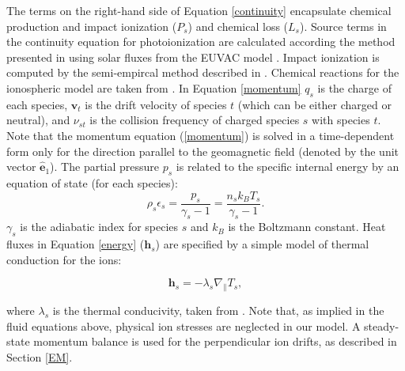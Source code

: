 \documentclass[11pt,letterpaper]{article}
\begin{document}
The terms on the right-hand side of Equation \ref{continuity} encapsulate chemical production and impact ionization ($P_s$) and chemical loss ($L_s$). Source terms in the continuity equation for photoionization are calculated according the method presented in \citet{Solomon:2005} using solar fluxes from the EUVAC model \citep{Richards:1994}. Impact ionization is computed by the semi-empircal method described in \citet{Fang:2008}. Chemical reactions for the ionospheric model are taken from \citet[][and references therein]{Diloy:1996,Stmaurice:1998}. In Equation \ref{momentum} $q_s$ is the charge of each species, $\mathbf{v}_t$ is the drift velocity of species $t$ (which can be either charged or neutral), and $\nu_{st}$ is the collision frequency of charged species $s$ with species $t$. Note that the momentum equation (\ref{momentum}) is solved in a time-dependent form only for the direction parallel to the geomagnetic field (denoted by the unit vector $\hat{\mathbf{e}}_1$). The partial pressure $p_s$ is related to the specific internal energy by an equation of state (for each species):
\begin{equation}
\rho_s \epsilon_s = \frac{p_s}{\gamma_s - 1} = \frac{n_s k_B T_s}{\gamma_s - 1}.
\end{equation}
$\gamma_s$ is the adiabatic index for species $s$ and $k_B$ is the Boltzmann constant.  Heat fluxes in Equation \ref{energy} ($\mathbf{h}_s$) are specified by a simple model of thermal conduction for the ions:  
\begin{linenomath*} \begin{equation}
\mathbf{h}_s = - \lambda_s \nabla_{\parallel} T_s,
\end{equation} \end{linenomath*}
where $\lambda_s$ is the thermal conducivity, taken from \citet{Schunk:1975}. Note that, as implied in the fluid equations above, physical ion stresses are neglected in our model.  A steady-state momentum balance is used for the perpendicular ion drifts, as described in Section \ref{EM}.

\end{document}
